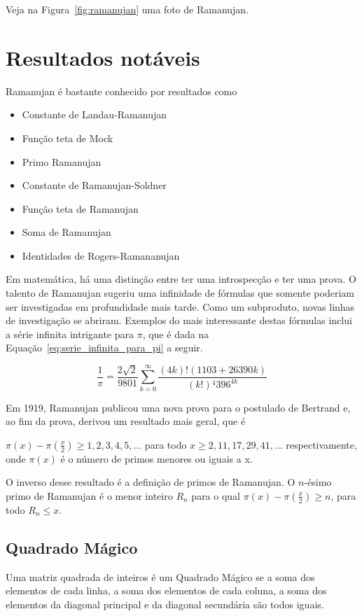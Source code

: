 \documentclass[12pt, a4paper]{article}
\begin{document}
Veja na Figura~\ref{fig:ramanujan} uma foto de Ramanujan. 

\section{Resultados notáveis}\label{sec:resultados}
\noindent
Ramanujan é bastante conhecido por resultados como
\begin{itemize}
    \item Constante de Landau-Ramanujan
    \item Função teta de Mock
    \item Primo Ramanujan
    \item Constante de Ramanujan-Soldner
    \item Função teta de Ramanujan
    \item Soma de Ramanujan
    \item Identidades de Rogers-Ramananujan
\end{itemize}

Em matemática, há uma distinção entre ter uma introspecção e ter uma prova. O 
talento de Ramanujan sugeriu uma infinidade de fórmulas que somente poderiam ser
investigadas em profundidade mais tarde. Como um subproduto, novas linhas de
investigação se abriram. Exemplos do mais interessante destas fórmulas inclui a
série infinita intrigante para $\pi$, que é dada na
Equação~\eqref{eq:serie_infinita_para_pi} a seguir.

\begin{equation}\label{eq:serie_infinita_para_pi}
   \frac{1}{\pi} = \frac{2\sqrt{2}}{9801} \sum_{k=0}^\infty
   \frac{(4k)!(1103+26390k)}{(k!){^4} 396^{4k}}
\end{equation}

Em 1919, Ramanujan publicou uma nova prova para o postulado de Bertrand e, ao
fim da prova, derivou um resultado mais geral, que é

\noindent
$ \pi(x) - \pi\left(\frac{x}{2}\right) \geq 1,2,3,4,5,\ldots $ para todo
$ x \geq 2,11,17,29,41,\ldots $ respectivamente, onde $ \pi(x) $ é o número de
primos menores ou iguais a x.

O inverso desse resultado é a definição de primos de Ramanujan. O $n$-ésimo
primo de Ramanujan é o menor inteiro $ R_{n} $ para o qual 
$ \pi(x) - \pi\left(\frac{x}{2}\right) \geq n $, para todo $ R_{n} \leq x $.

\subsection{Quadrado Mágico}\label{subsec:quadrado_magico}
\noindent
Uma matriz quadrada de inteiros é um Quadrado Mágico se a soma dos elementos de
cada linha, a soma dos elementos de cada coluna, a soma dos elementos da 
diagonal principal e da diagonal secundária são todos iguais.
\end{document}
